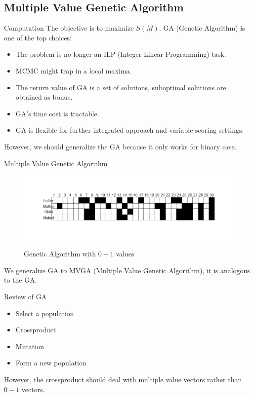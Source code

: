 \documentclass[xcolor=dvipsnames]{beamer}
\begin{document}
\subsection{Multiple Value Genetic Algorithm}
\begin{frame}{Computation}
The objective is to maximize $S(M)$. GA (Genetic Algorithm) is one of the top choices:\\
\begin{itemize}
\item The problem is no longer an ILP (Integer Linear Programming) task.\\
\item MCMC might trap in a local maxima.\\
\item The return value of GA is a set of solutions, suboptimal solutions are obtained as bonus.\\
\item GA's time cost is tractable.\\
\item GA is flexible for further integrated approach and variable scoring settings.\\
\end{itemize}
However, we should generalize the GA because it only works for binary case.\\
\end{frame}
\begin{frame}{Multiple Value Genetic Algorithm}
\begin{figure}
\centering
\includegraphics[width=0.9\linewidth]{GA.png}
\caption{Genetic Algorithm with $0-1$ values}
\end{figure}
We generalize GA to MVGA (Multiple Value Genetic Algorithm), it is analogous to the GA.\\
\end{frame}
\begin{frame}{Review of GA}
\begin{itemize}
\item Select a population\\
\item Crossproduct\\
\item Mutation\\
\item Form a new population
\end{itemize}
However, the crossproduct should deal with multiple value vectors rather than $0-1$ vectors.\\
\end{frame}
\end{document}
